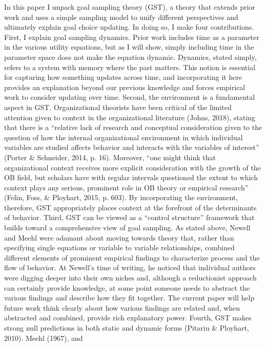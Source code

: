 \documentclass[english,,man]{apa6}
\theoremstyle{definition}
\theoremstyle{definition}
\theoremstyle{definition}
\theoremstyle{remark}
\begin{document}
In this paper I unpack goal sampling theory (GST), a theory that extends
prior work and uses a simple sampling model to unify different
perspectives and ultimately explain goal choice updating. In doing so, I
make four contributions. First, I explain goal sampling dynamics. Prior
work includes time as a parameter in the various utility equations, but
as I will show, simply including time in the parameter space does not
make the equation dynamic. Dynamics, stated simply, refers to a system
with memory where the past matters. This notion is essential for
capturing how something updates across time, and incorporating it here
provides an explanation beyond our previous knowledge and forces
empirical work to consider updating over time. Second, the environment
is a fundamental aspect in GST. Organizational theorists have been
critical of the limited attention given to context in the organizational
literature (Johns, 2018), stating that there is a \enquote{relative lack
of research and conceptual consideration given to the question of how
the internal organizational environment in which individual variables
are studied affects behavior and interacts with the variables of
interest} (Porter \& Schneider, 2014, p. 16). Moreover, \enquote{one
might think that organizational context receives more explicit
consideration with the growth of the OB field, but scholars have with
regular intervals questioned the extent to which context plays any
serious, prominent role in OB theory or empirical research} (Felin,
Foss, \& Ployhart, 2015, p. 603). By incorporating the environment,
therefore, GST appropriately places context at the forefront of the
determinants of behavior. Third, GST can be viewed as a \enquote{control
structure} framework that builds toward a comprehensive view of goal
sampling. As stated above, Newell and Meehl were adamant about moving
towards theory that, rather than specifying single equations or variable
to variable relationships, combined different elements of prominent
empirical findings to characterize process and the flow of behavior. At
Newell's time of writing, he noticed that individual authors were
digging deeper into their own niches and, although a reductionist
approach can certainly provide knowledge, at some point someone needs to
abstract the various findings and describe how they fit together. The
current paper will help future work think clearly about how various
findings are related and, when abstracted and combined, provide rich
explanatory power. Fourth, GST makes strong null predictions in both
static and dynamic forms (Pitariu \& Ployhart, 2010). Meehl (1967), and
\end{document}
